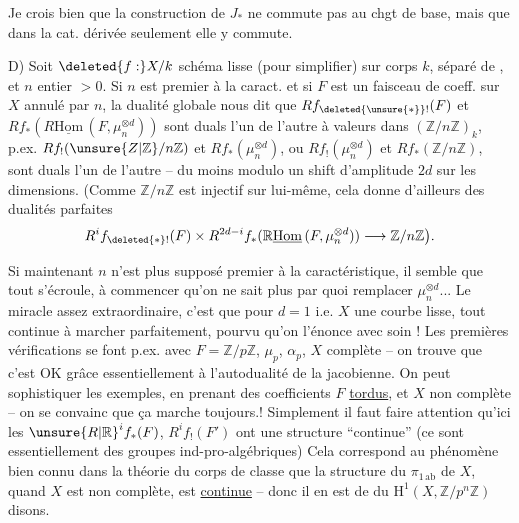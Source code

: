 Je crois bien que la construction de $J_*$ ne commute pas au chgt de base, mais que dans la cat. dérivée seulement elle y commute.

D) Soit $\deleted{f:}X/k$ schéma lisse  (pour simplifier) sur corps $k$, séparé de ,  et $n$ entier $>0$. Si $n$ est premier à la caract. et si $F$ est un
faisceau de coeff. sur $X$ annulé par $n$, la dualité globale nous dit que $Rf_{\deleted{\unsure{*}}!}(F)$ et $Rf_*(R\underline{\mathrm{Hom}}\,(F,\mu_n^{\otimes d}))$ sont duals l'un de l'autre à valeurs dans $(\mathbb{Z}/n\mathbb{Z})_k$, p.ex. $Rf_!(\unsure{Z|\mathbb{Z}}/n\mathbb{Z})$ et $Rf_*(\mu_n^{\otimes d})$, ou $Rf_!(\mu_n^{\otimes d})$ et $Rf_*(\mathbb{Z}/n\mathbb{Z})$, sont duals l'un de l'autre -- du moins modulo un shift d'amplitude $2d$ sur les dimensions. (Comme $\mathbb{Z}/n\mathbb{Z}$ est injectif sur lui-même, cela donne d'ailleurs des dualités parfaites
\[
R^{i}f_{\deleted{*}!}(F)\times R^{2d-i}f_*(\mathbb{R}\underline{\mathrm{Hom}}\,(F,\mu_n^{\otimes d}))\longrightarrow\mathbb{Z}/n\mathbb{Z}\big{)}.
\]

Si maintenant $n$ n'est plus supposé premier à la caractéristique,  il semble que tout s'écroule, à commencer qu'on ne sait plus  par quoi remplacer $\mu_n^{\otimes d}$... Le miracle assez extraordinaire, c'est que pour $d=1$ i.e. $X$ une courbe lisse, tout continue à marcher parfaitement, pourvu qu'on l'énonce avec soin ! Les premières vérifications se font p.ex. avec $F=\mathbb{Z}/p\mathbb{Z}$, $\mu_p$, $\alpha_p$, $X$ complète -- on trouve que c'est OK grâce essentiellement à l'autodualité de la jacobienne. On peut sophistiquer les exemples, en prenant des coefficients $F$ \uline{tordus}, et $X$ non complète -- on se convainc que ça marche toujours.! Simplement il faut faire attention qu'ici les ${\unsure{R|\mathbb{R}}}^if_*(F)$, $R^if_!(F')$ ont une structure ``continue'' (ce sont essentiellement des groupes ind-pro-algébriques)
Cela correspond au phénomène bien connu dans la théorie du corps de classe que la structure du $\pi_{1\,\mathrm{ab}}$ de $X$, quand $X$ est non complète, est \uline{continue} -- donc il en est de  du $\mathrm{H}^{1}(X,\mathbb{Z}/p^{n}\mathbb{Z})$ disons.

